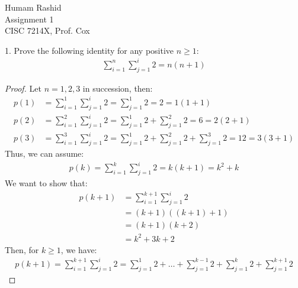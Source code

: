 \documentclass{scrartcl}
\begin{document}
\begin{flushleft}

    Humam Rashid\\
    Assignment 1\\
    CISC 7214X, Prof. Cox\\
    \bigskip
    
    1. Prove the following identity for any positive $n \geq 1$:
    \begin{align*}
        \sum_{i=1}^{n}\sum_{j=1}^{i} 2 = n (n + 1)
    \end{align*}

    \begin{proof}
        Let $n = 1,2,3$ in succession, then:
        \begin{align}
            p(1) &= \sum_{i=1}^{1}\sum_{j=1}^{i} 2 = \sum_{j=1}^{1} 2 = 2 = 1 (1 + 1)\\
            p(2) &= \sum_{i=1}^{2}\sum_{j=1}^{i} 2 = \sum_{j=1}^{1} 2
            + \sum_{j=1}^{2} 2 = 6 = 2 (2 + 1)\\
            p(3) &= \sum_{i=1}^{3}\sum_{j=1}^{i} 2 = \sum_{j=1}^{1} 2
            + \sum_{j=1}^{2} 2 + \sum_{j=1}^{3} 2 = 12 = 3 (3 + 1)
        \end{align}
        Thus, we can assume:
        \begin{align}
            p(k) = \sum_{i=1}^{k}\sum_{j=1}^{i} 2 = k (k + 1) = k^2 + k
        \end{align}
        We want to show that:
        \begin{align*}
            p(k + 1) &= \sum_{i=1}^{k + 1}\sum_{j=1}^{i} 2 \\
                     &= (k + 1) ((k + 1) + 1) \\
                     &= (k + 1) (k + 2) \\
                     &= k^2 + 3k + 2
        \end{align*}
        Then, for $k \geq 1$, we have:
        \begin{align}
            p(k + 1) = \sum_{i=1}^{k + 1}\sum_{j=1}^{i} 2 = \sum_{j=1}^{1} 2 + \ldots
            + \sum_{j=1}^{k - 1} 2 + \sum_{j=1}^{k} 2 + \sum_{j=1}^{k+1} 2
        \end{align}
    \end{proof}

\end{flushleft}
\end{document}
